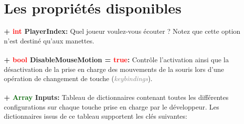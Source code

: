 \documentclass[a4paper, 11pt]{article}
\begin{document}
	\section{Les propriétés disponibles}
	\textbf{+ \textcolor{red}{int} PlayerIndex:} Quel joueur voulez-vous écouter ? Notez que cette option
	n'est destiné qu'aux manettes.\\\\
	\textbf{+ \textcolor{red}{bool} DisableMouseMotion = \textcolor{red}{true}:} Contrôle l'activation ainsi 
	que la désactivation de la prise en charge des mouvements de la souris lors d'une opération de 
	changement de touche (\textit{\textcolor{gray}{keybindings}}).\\\\
	\textbf{+ \textcolor{darkgreen}{Array} \hypertarget{inputs}{Inputs}:} Tableau de dictionnaires contenant 
	toutes les différentes configurations sur chaque touche prise en charge par le développeur. Les 
	dictionnaires issus de ce tableau supportent les clés suivantes:
\end{document}
